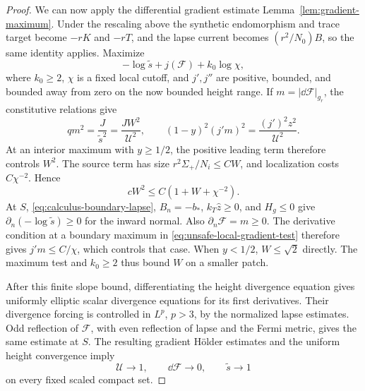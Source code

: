 \begin{proof}
We can now apply the differential gradient estimate
Lemma~\ref{lem:gradient-maximum}.  Under the rescaling above the
synthetic endomorphism and trace target become \(-rK\) and
\(-rT\), and the lapse current becomes \((r^2/N_0)B\), so the
same identity applies.  Maximize
\begin{equation}
 -\log\widetilde s+j(\mathcal F)+k_0\log\chi,
 \label{eq:unsafe-local-gradient-test}
\end{equation}
where \(k_0\ge2\), \(\chi\) is a fixed local cutoff, and
\(j',j''\) are positive, bounded, and bounded away from zero on
the now bounded height range.  If \(m=|\dd\mathcal F|_{g_r}\),
the constitutive relations give
\begin{equation}
 qm^2=\frac{J}{\widetilde s^2}
       =\frac{JW^2}{\mathcal U^2},\qquad
 (1-y)^2(j'm)^2=\frac{(j')^2z^2}{\mathcal U^2}.
 \label{eq:unsafe-scaled-gradient-algebra}
\end{equation}
At an interior maximum with \(y\ge1/2\), the positive leading
term therefore controls \(W^2\).  The source term has size
\(r^2\Sigma_+/N_i\le CW\), and localization costs
\(C\chi^{-2}\).  Hence
\begin{equation}
 cW^2\le C(1+W+\chi^{-2}).
 \label{eq:unsafe-slope-bound}
\end{equation}
At \(S\), \eqref{eq:calculus-boundary-lapse}, \(B_n=-b_*\),
\(k_T\hat z\ge0\), and \(H_g\le0\) give
\(\partial_n(-\log\widetilde s)\ge0\) for the inward normal.
Also \(\partial_n\mathcal F=m\ge0\).  The derivative condition
at a boundary maximum in \eqref{eq:unsafe-local-gradient-test}
therefore gives \(j'm\le C/\chi\), which controls that case.
When \(y<1/2\), \(W\le\sqrt2\) directly.  The maximum test
and \(k_0\ge2\) thus bound \(W\) on a smaller patch.

After this finite slope bound, differentiating the height divergence
equation gives uniformly elliptic scalar divergence equations for
its first derivatives.  Their divergence forcing is controlled in
\(L^p\), \(p>3\), by the normalized lapse estimates.  Odd
reflection of \(\mathcal F\), with even reflection of lapse and
the Fermi metric, gives the same estimate at \(S\).  The resulting
gradient H\"older estimates and the uniform height convergence
imply
\begin{equation}
 \mathcal U\longrightarrow1,\qquad
 \dd\mathcal F\longrightarrow0,\qquad
 \widetilde s\longrightarrow1
 \label{eq:unsafe-flat-graph-limit}
\end{equation}
on every fixed scaled compact set.


\end{proof}
